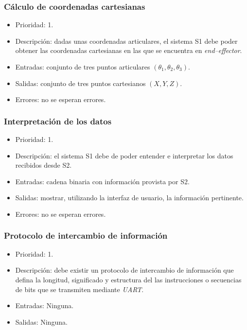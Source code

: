 \subsubsection{Cálculo de coordenadas cartesianas}
\begin{itemize}
    \item Prioridad: 1.
    \item Descripción: dadas unas coordenadas articulares, el sistema \ac{S1} debe poder obtener las coordenadas cartesianas en las que se encuentra en \textit{end--effector}.
    \item Entradas: conjunto de tres puntos articulares $(\theta_1, \theta_2, \theta_3)$.
    \item Salidas: conjunto de tres puntos cartesianos $(X,Y,Z)$.
    \item Errores: no se esperan errores.
\end{itemize}

\subsubsection{Interpretación de los datos}
\begin{itemize}
    \item Prioridad: 1.
    \item Descripción: el sistema \ac{S1} debe de poder entender e interpretar los datos recibidos desde \ac{S2}.
    \item Entradas: cadena binaria con información provista por \ac{S2}.
    \item Salidas: mostrar, utilizando la interfaz de usuario, la información pertinente.
    \item Errores: no se esperan errores.
\end{itemize}

\subsubsection{Protocolo de intercambio de información}
\begin{itemize}
    \item Prioridad: 1.
    \item Descripción: debe existir un protocolo de intercambio de información que defina la longitud, significado y estructura del las instrucciones o secuencias de bits que se transmiten mediante \textit{UART}.
    \item Entradas: Ninguna.
    \item Salidas: Ninguna.
\end{itemize}    

